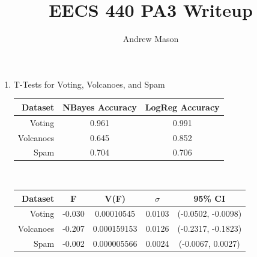 \documentclass[12pt]{article}
\title{EECS 440 PA3 Writeup}
\author{Andrew Mason}
\begin{document}
\maketitle

\begin{enumerate}
    \item T-Tests for Voting, Volcanoes, and Spam\\
        \begin{tabular}{|r|c|c|}
          \hline
          Dataset & NBayes Accuracy & LogReg Accuracy \\ \hline
          Voting & 0.961 & 0.991 \\ \hline
          Volcanoes & 0.645 & 0.852 \\ \hline
          Spam & 0.704 & 0.706 \\ \hline
        \end{tabular}\\

        \begin{tabular}{|r|c|c|c|c|}
          \hline
          Dataset & F & V(F) & $\sigma$ & 95\% CI \\ \hline
          Voting & -0.030 & 0.00010545 & 0.0103 & (-0.0502, -0.0098)\\ \hline
          Volcanoes & -0.207 & 0.000159153 & 0.0126 & (-0.2317, -0.1823) \\ \hline
          Spam & -0.002 & 0.000005566 & 0.0024 & (-0.0067, 0.0027)\\ \hline
        \end{tabular}\\


\end{enumerate}
\end{document}
